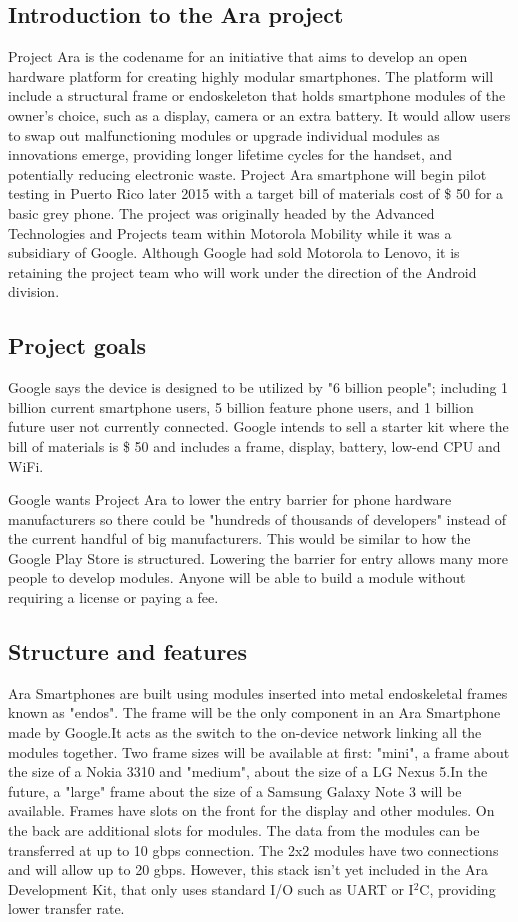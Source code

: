 \subsection{Introduction to the Ara project}

Project Ara is the codename for an initiative that aims to develop an open hardware platform for creating highly modular smartphones. The platform will include a structural frame or endoskeleton that holds smartphone modules of the owner's choice, such as a display, camera or an extra battery. It would allow users to swap out malfunctioning modules or upgrade individual modules as innovations emerge, providing longer lifetime cycles for the handset, and potentially reducing electronic waste. Project Ara smartphone will begin pilot testing in Puerto Rico later 2015 with a target bill of materials cost of \$ 50 for a basic grey phone. The project was originally headed by the Advanced Technologies and Projects team within Motorola Mobility while it was a subsidiary of Google. Although Google had sold Motorola to Lenovo, it is retaining the project team who will work under the direction of the Android division.

\subsection{Project goals}
Google says the device is designed to be utilized by "6 billion people"; including 1 billion current smartphone users, 5 billion feature phone users, and 1 billion future user not currently connected. Google intends to sell a starter kit where the bill of materials is \$ 50 and includes a frame, display, battery, low-end CPU and WiFi.

Google wants Project Ara to lower the entry barrier for phone hardware manufacturers so there could be "hundreds of thousands of developers" instead of the current handful of big manufacturers. This would be similar to how the Google Play Store is structured. Lowering the barrier for entry allows many more people to develop modules. Anyone will be able to build a module without requiring a license or paying a fee.

\subsection{Structure and features}

Ara Smartphones are built using modules inserted into metal endoskeletal frames known as "endos". The frame will be the only component in an Ara Smartphone made by Google.It acts as the switch to the on-device network linking all the modules together. Two frame sizes will be available at first: "mini", a frame about the size of a Nokia 3310 and "medium", about the size of a LG Nexus 5.In the future, a "large" frame about the size of a Samsung Galaxy Note 3 will be available. Frames have slots on the front for the display and other modules. On the back are additional slots for modules. The data from the modules can be transferred at up to 10 gbps connection. The 2x2 modules have two connections and will allow up to 20 gbps. However, this stack isn't yet included in the Ara Development Kit, that only uses standard I/O such as UART or I$^2$C, providing lower transfer rate.

